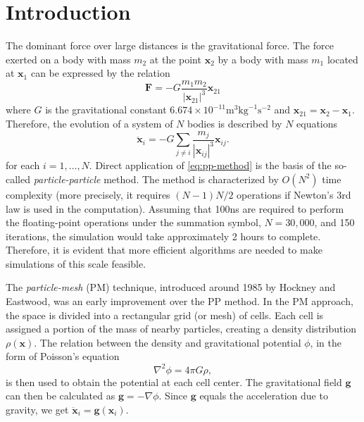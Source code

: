 \chapter{Introduction}
The dominant force over large distances is the gravitational force.
The force exerted on a body with mass $m_2$ at the point $\mathbf{x}_2$ by a body with mass $m_1$ located at $\mathbf{x}_1$ can be expressed by the relation
\begin{equation}\label{eq:law-of-uni-grav}
    \mathbf{F} = -G\frac{m_1m_2}{|\mathbf{x}_{21}|^3}\mathbf{x}_{21}
\end{equation}
where $G$ is the gravitational constant $6.674\times 10^{-11} \mathrm{m}^3 \mathrm{kg}^{-1}\mathrm{s}^{-2}$ and $\mathbf{x}_{21} = \mathbf{x}_2 - \mathbf{x}_1$.
Therefore, the evolution of a system of $N$ bodies is described by $N$ equations
\begin{equation}\label{eq:pp-method}
    \ddot{\mathbf{x}}_i = -G\sum_{j\neq i} \frac{m_j}{|\mathbf{x}_{ij}|^3}\mathbf{x}_{ij}.
\end{equation}
for each $i = 1,\dots, N$.
Direct application of \autoref{eq:pp-method} is the basis of the so-called \textit{particle-particle} method.
The method is characterized by $O(N^2)$ time complexity (more precisely, it requires $(N-1)N/2$ operations if Newton's 3rd law is used in the computation).
Assuming that 100ns are required to perform the floating-point operations under the summation symbol, $N=30,000$, and 150 iterations, the simulation would take approximately 2 hours to complete.
Therefore, it is evident that more efficient algorithms are needed to make simulations of this scale feasible.

The \textit{particle-mesh} (PM) technique, introduced around 1985 by Hockney and Eastwood, was an early improvement over the PP method.
In the PM approach, the space is divided into a rectangular grid (or mesh) of cells.
Each cell is assigned a portion of the mass of nearby particles, creating a density distribution $\rho(\mathbf{x})$.
The relation between the density and gravitational potential $\phi$, in the form of Poisson's equation
\begin{equation}\label{eq:poisson}
    \nabla^2\phi = 4\pi G \rho,
\end{equation}
is then used to obtain the potential at each cell center.
The gravitational field $\mathbf{g}$ can then be calculated as $\mathbf{g} = -\nabla \phi$.
Since $\mathbf{g}$ equals the acceleration due to gravity, we get $\ddot{\mathbf{x}}_i = \mathbf{g}(\mathbf{x}_i)$.

